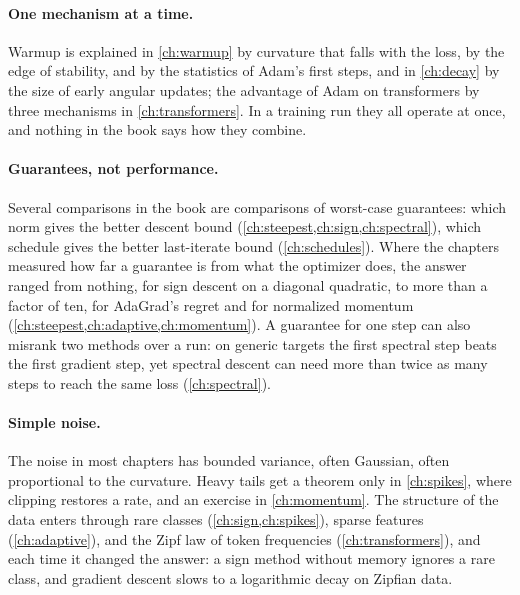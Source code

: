\begin{refsection}
\paragraph{One mechanism at a time.} Warmup is explained in \cref{ch:warmup} by curvature that falls with the loss, by the edge of stability, and by the statistics of Adam's first steps, and in \cref{ch:decay} by the size of early angular updates; the advantage of Adam on transformers by three mechanisms in \cref{ch:transformers}. In a training run they all operate at once, and nothing in the book says how they combine.

\paragraph{Guarantees, not performance.} Several comparisons in the book are comparisons of worst-case guarantees: which norm gives the better descent bound (\cref{ch:steepest,ch:sign,ch:spectral}), which schedule gives the better last-iterate bound (\cref{ch:schedules}). Where the chapters measured how far a guarantee is from what the optimizer does, the answer ranged from nothing, for sign descent on a diagonal quadratic, to more than a factor of ten, for AdaGrad's regret and for normalized momentum (\cref{ch:steepest,ch:adaptive,ch:momentum}). A guarantee for one step can also misrank two methods over a run: on generic targets the first spectral step beats the first gradient step, yet spectral descent can need more than twice as many steps to reach the same loss (\cref{ch:spectral}).

\paragraph{Simple noise.} The noise in most chapters has bounded variance, often Gaussian, often proportional to the curvature. Heavy tails get a theorem only in \cref{ch:spikes}, where clipping restores a rate, and an exercise in \cref{ch:momentum}. The structure of the data enters through rare classes (\cref{ch:sign,ch:spikes}), sparse features (\cref{ch:adaptive}), and the Zipf law of token frequencies (\cref{ch:transformers}), and each time it changed the answer: a sign method without memory ignores a rare class, and gradient descent slows to a logarithmic decay on Zipfian data.


\end{refsection}
